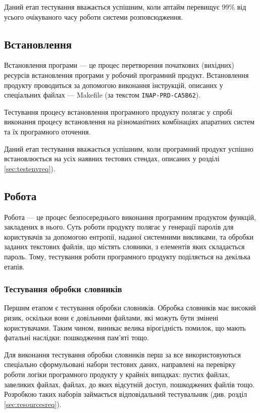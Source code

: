 \documentclass[a4paper,oneside,DIV=12,12pt]{scrartcl}
\begin{document}
			Даний етап тестування вважається успішним, коли аптайм перевищує 99\% від усього очікуваного часу роботи системи розповсюдження.
			
		\subsection{Встановлення}
			Встановлення програми --- це процес перетворення початкових (вихідних) ресурсів встановлення програми у робочий програмний продукт. Встановлення продукту проводиться за допомогою виконання інструкцій, описаних у спеціальних файлах --- Makefile (за текстом \texttt{INAP-PRD-CA5B62}).
			
			Тестування процесу встановлення програмного продукту полягає у спробі виконання процесу встановлення на різноманітних комбінаціях апаратних систем та їх програмного оточення.
			
			Даний етап тестування вважається успішним, коли програмний продукт успішно встановлюється на усіх наявних тестових стендах, описаних у розділі \ref{sec:testenvreq}).
			
		\subsection{Робота}
			Робота --- це процес безпосереднього виконання програмним продуктом функцій, закладених в нього. Суть роботи продукту полягає у генерації паролів для користувачів за допомогою ентропії, наданої системними викликами, та обробки заданих текстових файлів, що містять словники, з елементів яких складається пароль. Тому, тестування роботи програмного продукту поділяється на декілька етапів.
			
			\subsubsection{Тестування обробки словників}
				Першим етапом є тестування обробки словників. Обробка словників має високий ризик, оскільки вони є довільними файлами, які можуть бути змінені користувачами. Таким чином, виникає велика вірогідність помилок, що мають фатальні наслідки: пошкодження пам'яті тощо.
				
				Для виконання тестування обробки словників перш за все використовуються спеціально сформульовані набори тестових даних, направлені на перевірку роботи логіки програмного продукту у крайніх випадках: пустих файлах, завеликих файлах, файлах, до яких відсутній доступ, пошкоджених файлів тощо. Розробкою таких наборів займається відповідальний тестувальник (див. розділ \ref{sec:resourcesreq}).
\end{document}
